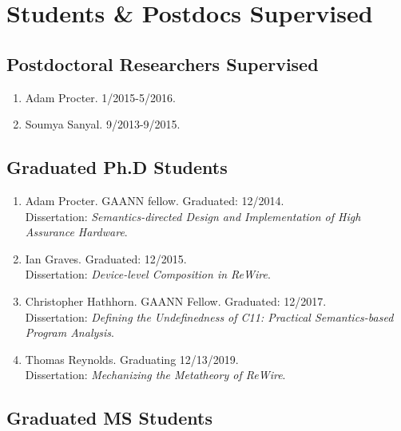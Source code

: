 \documentclass[12pt]{article} %
\begin{document}
\section*{Students \& Postdocs Supervised}
\subsection*{Postdoctoral Researchers Supervised}

\begin{enumerate}[leftmargin=0.0mm]
\item Adam Procter. 1/2015-5/2016.
\item Soumya Sanyal. 9/2013-9/2015.
\end{enumerate}

\subsection*{Graduated Ph.D Students}

\begin{enumerate}[leftmargin=0.0mm]
\item Adam Procter. GAANN fellow. Graduated: 12/2014.\\
\newblock Dissertation: \emph{Semantics-directed Design and Implementation of High Assurance Hardware}.

\item Ian Graves. Graduated: 12/2015.\\
\newblock Dissertation: \emph{Device-level Composition in ReWire}.


\item Christopher Hathhorn. GAANN Fellow. Graduated: 12/2017.\\
\newblock Dissertation: \emph{Defining the Undefinedness of C11: Practical Semantics-based Program Analysis}.

\item Thomas Reynolds. Graduating 12/13/2019. \\
\newblock Dissertation: \emph{Mechanizing the Metatheory of ReWire}.


\end{enumerate}

\subsection*{Graduated MS Students}
\end{document}
